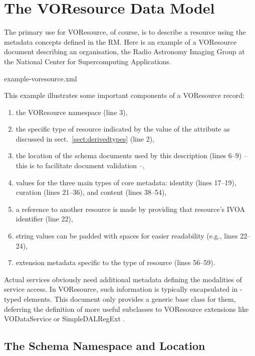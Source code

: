 \documentclass[11pt,a4paper]{ivoa}
\begin{document}
\section{The VOResource Data Model}
\label{sect:model}

The primary use for VOResource, of course, is to describe a resource
using the metadata concepts defined in the RM.  Here is an example of a
VOResource document describing an organisation, the Radio Astronomy
Imaging Group at the National Center for Supercomputing Applications.


   {example-voresource.xml}

This example illustrates some important components of a VOResource
record:

\begin{enumerate}
  \item the VOResource namespace (line 3),
  \item the specific type of resource indicated by
       the value of the  attribute as
       discussed in sect.~\ref{sect:derivedtypes} (line 2),
  \item the location of the schema documents used by
       this description (lines 6--9) -- this is to facilitate document
       validation --,
  \item values for the three main types of core metadata:
       identity (lines 17--19), curation (lines 21--36), and content
       (lines 38--54),
  \item a reference to another resource is made by
       providing that resource's IVOA identifier (line 22),
  \item string values can be padded with spaces
       for easier readability (e.g., lines 22--24),
  \item extension metadata specific to the type of
       resource (lines 56--59).
\end{enumerate}

Actual services obviously need additional metadata defining the
modalities of service access. In VOResource, such information
is typically encapsulated in -typed elements. This
document only provides a generic base class for them, deferring the
definition of more useful subclasses to VOResource extensions like
VODataService \citep{2021ivoa.spec.1102D} or SimpleDALRegExt
\citep{2017ivoa.spec.0530P}.


\subsection{The Schema Namespace and Location}
\end{document}
